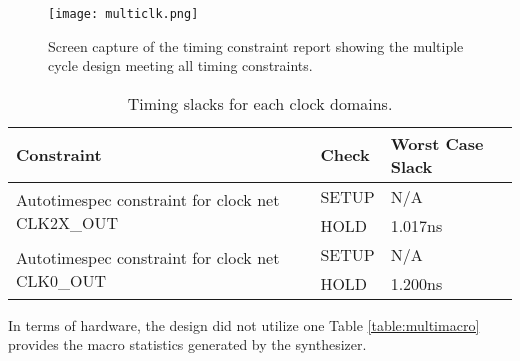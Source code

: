 \documentclass[paper=usletter, fontsize=12pt]{article}
\begin{document}
        \begin{figure}[ht]
            \begin{center}
                \texttt{[image: multiclk.png]}
                \caption{Screen capture of the timing constraint report showing
                the multiple cycle design meeting all timing constraints.}
                \label{fig:multiclk}
            \end{center}
        \end{figure}

        \begin{table}[h]
            \caption{Timing slacks for each clock domains.}
            \label{table:singslacks}
            \centering
            \begin{tabular}{ lm{5em}m{10em} }
\hline
\textbf{Constraint} & \textbf{Check}  &   \textbf{Worst Case Slack} \\
\hline
\multirow{ 2}{*}{Autotimespec constraint for clock net CLK2X\_OUT} & SETUP &
N/A \\
 & HOLD & 1.017ns \\
\multirow{ 2}{*}{Autotimespec constraint for clock net CLK0\_OUT} & SETUP &
N/A \\
 & HOLD & 1.200ns \\

\hline
            \end{tabular}
        \end{table}

        In terms of hardware, the design did not utilize one  Table \ref{table:multimacro} provides the macro statistics generated
        by the synthesizer.
\end{document}
